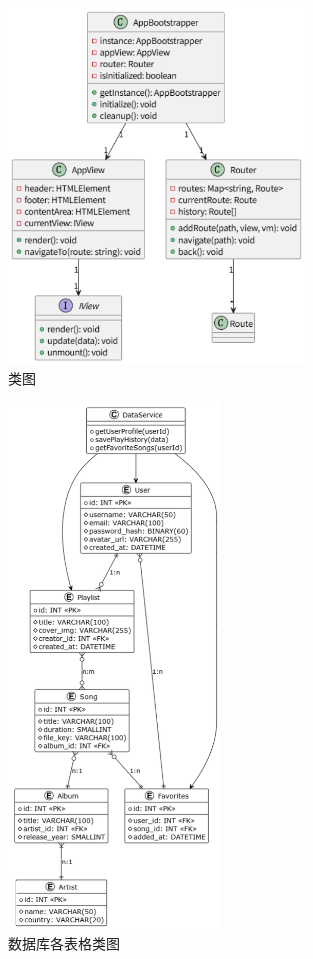 \documentclass{base}
\numberwithin{figure}{section} %
\begin{document}
\begin{figure}[H]
    \centering
    \includegraphics[width=0.7\textwidth]{images/5-11.png}
    \caption{类图}
\end{figure}

\begin{figure}[H]
    \centering
    \includegraphics[width=0.5\textwidth]{images/5-12.png}
    \caption{数据库各表格类图}
\end{figure}
\end{document}
